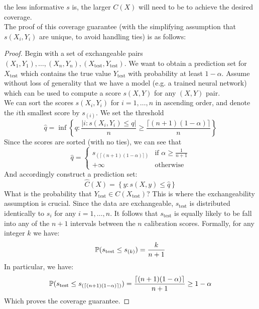 \documentclass[a4paper, 12pt]{article}
\begin{document}
the less informative $s$ is, the larger $C(X)$ will need to be to achieve the desired coverage. \\
The proof of this coverage guarantee (with the simplifying assumption that $s(X_i, Y_i)$ are unique, to avoid handling ties) is as follows:
\begin{proof}
    Begin with a set of exchangeable pairs $(X_1, Y_1), \ldots, (X_n, Y_n), (X_\text{test}, Y_\text{test})$. We
    want to obtain a prediction set for $X_{\text{test}}$ which contains the true value $Y_\text{test}$ with probability at least $1-\alpha$.
    Assume without loss of generality that we have a model (e.g. a trained neural network) which can be
    used to compute a score $s(X, Y)$ for any $(X, Y)$ pair. \\
    We can sort the scores $s(X_i, Y_i)$ for $i = 1, \ldots, n$ in ascending order, and denote the $i$th smallest score by $s_{(i)}$.
    We set the threshold
    \[\hat{q} = \inf \left\{ q: \frac{\left| i : s(X_i, Y_i) \leq q \right|}{n} \geq \frac{\lceil (n+1)(1-\alpha) \rceil }{n}\right\}\]
    Since the scores are sorted (with no ties), we can see that $$\hat{q} = \begin{cases}
            s_{(\lceil (n+1)(1-\alpha) \rceil)} & \text{if } \alpha \geq \frac{1}{n+1} \\
            +\infty                             & \text{otherwise }
        \end{cases}$$
    And accordingly construct a prediction set:
    \[\hat{C}(X) = \left\{ y: s(X, y) \leq \hat{q} \right\}\]
    What is the probability that $Y_{\text{test}} \in C(X_{\text{test}})$? This
    is where the exchangeability assumption is crucial. Since the data are exchangeable,
    $s_{\text{test}}$ is distributed identically to $s_{i}$ for any $i = 1, \ldots, n$.
    It follows that $s_{\text{test}}$ is equally likely to be fall into any of the $n+1$ intervals between the $n$ calibration scores.
    Formally, for any integer $k$ we have:
    \[ \P(s_{\text{test}} \leq s_{(k)}) = \frac{k}{n+1} \]
    In particular, we have:
    \[ \P(s_{\text{test}} \leq s_{(\lceil (n+1)(1-\alpha) \rceil)}) = \frac{\lceil (n+1)(1-\alpha) \rceil}{n+1} \geq 1 - \alpha \]
    Which proves the coverage guarantee.
\end{proof}
\end{document}
